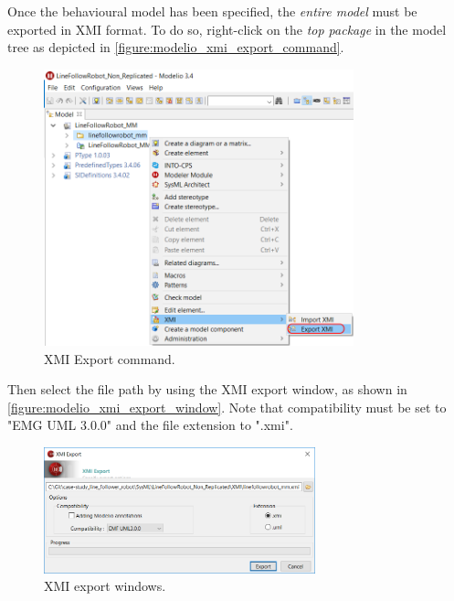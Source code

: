 Once the behavioural model has been specified, the \emph{entire model} must be exported in XMI format. To do so, right-click on the \emph{top package} in the model tree as depicted in \autoref{figure:modelio_xmi_export_command}.   
%
\begin{figure}[hpt!]
	\centerline{\includegraphics[width=0.8\textwidth]{figures/modelio/xmi_export_command.png}}
	\caption{XMI Export command.}
	\label{figure:modelio_xmi_export_command}
\end{figure}
%
Then select the file path by using the XMI export window, as shown in \autoref{figure:modelio_xmi_export_window}. Note that compatibility must be set to "EMG UML 3.0.0" and the file extension to ".xmi".
%
\begin{figure}[hpt!]
	\centerline{\includegraphics[width=0.7\textwidth]{figures/modelio/xmi_export_window.png}}
	\caption{XMI export windows.}
	\label{figure:modelio_xmi_export_window}
\end{figure}


\clearpage